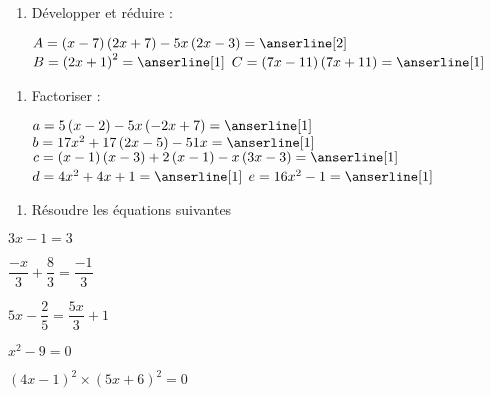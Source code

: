 \documentclass[a4paper,12pt]{article}
\begin{document}
\devoir[sem=2,prv=true,ds=true,num=4 ,niv=2 ,date=02/03/2023]

\begin{exo}[6]
\begin{enumerate}
\item Développer et réduire :

\(
A=\left(x-7\right)\left(2x+7\right)-5x\left(2x-3\right)=\anserline[2]
\)
\(
B=\left(2x+1\right)^{2}=\anserline[1]
\)
\(
C=\left(7x-11\right)\left(7x+11\right)=\anserline[1]
\)
\end{enumerate}
\end{exo}

\begin{exo}[9]
\begin{enumerate}
\item Factoriser :

\(
a=5\left(x-2\right)-5x\left(-2x+7\right)=\anserline[1]
\)
\(
b=17x^{2}+17\left(2x-5\right)-51x=\anserline[1]
\)
\(
c=\left(x-1\right)\left(x-3\right)+2\left(x-1\right)-x\left(3x-3\right)=\anserline[1]
\)
\(
d=4x^{2}+4x+1=\anserline[1]
\)
\(
e=16x^{2}-1=\anserline[1]
\)
\end{enumerate}
\end{exo}

\begin{exo}[5]
\begin{enumerate}
\item Résoudre les équations suivantes 
\end{enumerate}
\begin{multicols}{3}
\(3x-1=3\)\newline
\anserline[4]
\columnbreak

\(\dfrac{-x}{3}+\dfrac{8}{3}=\dfrac{-1}{3}\)\newline
\anserline[4]
\columnbreak

\(5x-\dfrac{2}{5}=\dfrac{5x}{3}+1\)\newline
\anserline[4]
\end{multicols}

\begin{multicols}{2}
\(x^{2}-9=0\)\newline
\anserline[12]
\columnbreak

\(\left(4x-1\right)^{2}\times(5x+6)^{2}=0\)\newline
\anserline[12]
\end{multicols}
\end{exo}
\end{document}
